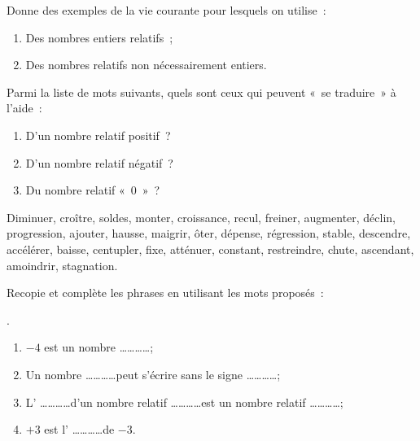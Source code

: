 

\begin{exercice}
Donne des exemples de la vie courante pour lesquels on utilise :
\begin{enumerate}
 \item Des nombres entiers relatifs ;
 \item Des nombres relatifs non nécessairement entiers.
 \end{enumerate}
\end{exercice}


\begin{exercice}[Interprétation]
Parmi la liste de mots suivants, quels sont ceux qui peuvent « se traduire » à l'aide : 
\begin{enumerate}
 \item D'un nombre relatif positif ?
 \item D'un nombre relatif négatif ?
 \item Du nombre relatif « 0 » ?
 \end{enumerate}
 
Diminuer, croître, soldes, monter, croissance, recul, freiner, augmenter, déclin, progression, ajouter, hausse, maigrir, ôter, dépense, régression, stable, descendre, accélérer, baisse, centupler, fixe, atténuer, constant, restreindre, chute, ascendant, amoindrir, stagnation.
\end{exercice}


\begin{exercice}
Recopie et complète les phrases en utilisant les mots proposés :

 \quad {} \quad {} \quad {} \quad {}.

\begin{enumerate}
 \item $- 4$ est un nombre \ldots \ldots \ldots \ldots ;
 \item Un nombre \ldots \ldots \ldots \ldots peut s'écrire sans le signe \ldots \ldots \ldots \ldots ;
 \item L' \ldots \ldots \ldots \ldots d'un nombre relatif \ldots \ldots \ldots \ldots est un nombre relatif \ldots \ldots \ldots \ldots ;
 \item $+ 3$ est l' \ldots \ldots \ldots \ldots de $- 3$.
 \end{enumerate}
\end{exercice}


